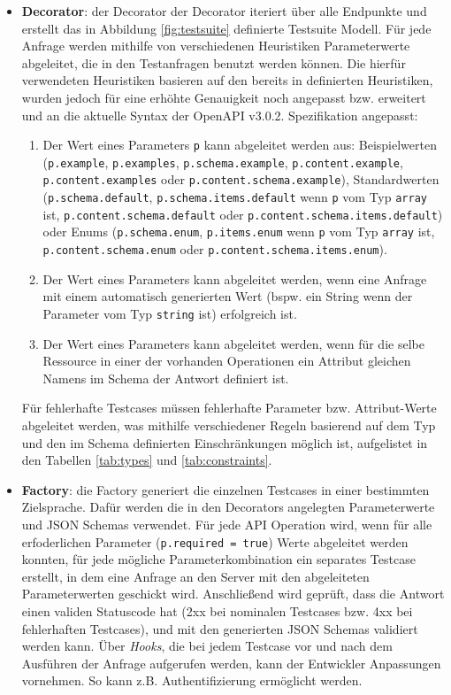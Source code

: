 \begin{itemize}
	\item \textbf{Decorator}: der Decorator der Decorator iteriert über alle Endpunkte und erstellt das in Abbildung \ref{fig:testsuite} definierte Testsuite Modell. Für jede Anfrage werden mithilfe von verschiedenen Heuristiken Parameterwerte abgeleitet, die in den Testanfragen benutzt werden können. Die hierfür verwendeten Heuristiken basieren auf den bereits in \textcite{ed2018automatic} definierten Heuristiken, wurden jedoch für eine erhöhte Genauigkeit noch angepasst bzw. erweitert und an die aktuelle Syntax der OpenAPI v3.0.2. Spezifikation angepasst: 
	\begin{enumerate}
		\item Der Wert eines Parameters \lstinline|p| kann abgeleitet werden aus: Beispielwerten (\lstinline|p.example|, \lstinline|p.examples|, \lstinline|p.schema.example|, \lstinline|p.content.example|, \lstinline|p.content.examples| oder \lstinline|p.content.schema.example|), Standardwerten (\lstinline|p.schema.default|, \lstinline|p.schema.items.default| wenn \lstinline|p| vom Typ \lstinline|array| ist, \lstinline|p.content.schema.default| oder \lstinline|p.content.schema.items.default|) oder Enums (\lstinline|p.schema.enum|,  \lstinline|p.items.enum| wenn \lstinline|p| vom Typ \lstinline|array| ist, \lstinline|p.content.schema.enum| oder \lstinline|p.content.schema.items.enum|).
		\item Der Wert eines Parameters kann abgeleitet werden, wenn eine Anfrage mit einem automatisch generierten Wert (bspw. ein String wenn der Parameter vom Typ \lstinline|string| ist) erfolgreich ist.
		\item Der Wert eines Parameters kann abgeleitet werden, wenn für die selbe Ressource in einer der vorhanden Operationen ein Attribut gleichen Namens im Schema der Antwort definiert ist.
	\end{enumerate}
	Für fehlerhafte Testcases müssen fehlerhafte Parameter bzw. Attribut-Werte abgeleitet werden, was mithilfe verschiedener Regeln basierend auf dem Typ und den im Schema definierten Einschränkungen möglich ist, aufgelistet in den Tabellen \ref{tab:types} und \ref{tab:constraints}. 
	\item \textbf{Factory}: die Factory generiert die einzelnen Testcases in einer bestimmten Zielsprache. Dafür werden die in den Decorators angelegten Parameterwerte und JSON Schemas verwendet. Für jede API Operation wird, wenn für alle erfoderlichen Parameter (\lstinline|p.required = true|) Werte abgeleitet werden konnten,  für jede mögliche Parameterkombination ein separates Testcase erstellt, in dem eine Anfrage an den Server mit den abgeleiteten Parameterwerten geschickt wird. Anschließend wird geprüft, dass die Antwort einen validen Statuscode hat (2xx bei nominalen Testcases bzw. 4xx bei fehlerhaften Testcases), und mit den generierten JSON Schemas validiert werden kann. Über \emph{Hooks}, die bei jedem Testcase vor und nach dem Ausführen der Anfrage aufgerufen werden, kann der Entwickler Anpassungen vornehmen. So kann z.B. Authentifizierung ermöglicht werden. 
\end{itemize}

